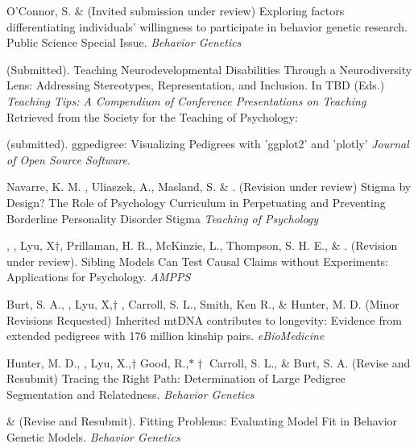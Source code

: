 \begin{etaremune}
\item O'Connor, S. \& \meb (Invited submission under review) Exploring factors differentiating individuals’ willingness to participate in behavior genetic research. Public Science Special Issue. \textit{Behavior Genetics}
\item \meb (Submitted). Teaching Neurodevelopmental Disabilities Through a Neurodiversity Lens: Addressing Stereotypes, Representation, and Inclusion.  In TBD  (Eds.) \textit{Teaching Tips: A Compendium of Conference Presentations on Teaching} Retrieved from the Society for the Teaching of Psychology: \href{http://teachpsych.org/ebooks/}{\small\color{blue}{teachpsych.org/ebooks/}}

\item \meb  (submitted). ggpedigree: Visualizing Pedigrees with 'ggplot2' and 'plotly' \textit{Journal of Open Source Software}. \href{https://joss.theoj.org/papers/e5116b83b03e2740960d1153c45f9480}{\small\color{blue}{submission}}



\item Navarre, K. M. \noteB, Uliaszek, A., Masland, S. \& \meb. (Revision under review) Stigma by Design? The Role of Psychology Curriculum in Perpetuating and Preventing Borderline Personality Disorder Stigma \textit{Teaching of Psychology}

\item \meb, \jt, Lyu, X$\dagger$, Prillaman, H. R.\noteA, McKinzie, L.\noteA, Thompson, S. H. E.\noteA, \& \joe. (Revision under review). Sibling Models Can Test Causal Claims without Experiments: Applications for Psychology. \href{https://osf.io/zpdwt/}{\small\color{blue}{osf.io/zpdwt/}} \textit{AMPPS} %

\item Burt, S. A., \meb, Lyu, X,$\dagger$ \joe, Carroll, S. L., Smith, Ken R., \& Hunter, M. D. (Minor Revisions Requested) Inherited mtDNA contributes to longevity: Evidence from extended pedigrees with 176 million kinship pairs. \textit{eBioMedicine}%

\item Hunter, M. D., \meb, Lyu, X.,$\dagger$ Good, R.,$*\dagger$ Carroll, S. L., \& Burt, S. A. (Revise and Resubmit) Tracing the Right Path: Determination of Large Pedigree Segmentation and Relatedness. \textit{Behavior Genetics}


\item \meb \& \joe (Revise and Resubmit). Fitting Problems: Evaluating Model Fit in Behavior Genetic Models. \textit{Behavior Genetics}  \href{https://doi.org/10.31234/osf.io/qys83}{\small\color{blue}{10.31234/osf.io/qys83}}
\end{etaremune}
